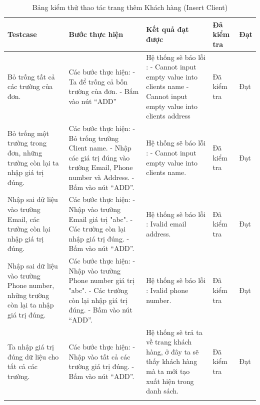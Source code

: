 \documentclass[a4paper]{article}
\begin{document}
\begin{longtable}{ | p{} |p{} | p{}  | p{}  | p{}  | } 
\hline
\textbf{Testcase}& \textbf{Bước thực hiện}& \textbf{Kết quả đạt được} & \textbf{Đã kiểm tra}& \textbf{Đạt} \\ 
\hline
\hline
Bỏ trống tất cả các trường của đơn. &
Các bước thực hiện: \newline
- Ta để trống cả bốn trường của đơn. \newline
- Bấm vào nút “ADD”
&
Hệ thống sẽ báo lỗi :  \newline
- Cannot input empty value into clients name \newline
- Cannot input empty value into clients address
&
Đã kiểm tra &
Đạt \\

\hline
Bỏ trống một trường trong đơn, những trường còn lại ta nhập giá trị đúng. &
Các bước thực hiện: \newline
- Bỏ trống trường Client name.  \newline
- Nhập các giá trị đúng vào trường Email, Phone number và Address.  \newline
- Bấm vào nút “ADD”.
&
Hệ thống sẽ báo lỗi :  \newline
- Cannot input empty value into clients name.
&
Đã kiểm tra &
Đạt \\

\hline
Nhập sai dữ liệu vào trường Email, các trường còn lại nhập giá trị đúng. &
Các bước thực hiện: \newline
- Nhập vào trường Email giá trị  "abc". \newline
- Các trường còn lại nhập giá trị đúng.  \newline
- Bấm vào nút “ADD”.
&
Hệ thống sẽ báo lỗi : Ivalid email address.
&
Đã kiểm tra &
Đạt \\

\hline
Nhập sai dữ liệu vào trường Phone number, những trường còn lại ta nhập giá trị đúng. &
Các bước thực hiện: \newline
- Nhập vào trường Phone number giá trị  "abc". \newline
- Các trường còn lại nhập giá trị đúng.  \newline
- Bấm vào nút “ADD”.
&
Hệ thống sẽ báo lỗi : Ivalid phone number.
&
Đã kiểm tra &
Đạt \\

\hline
Ta nhập giá trị đúng dữ liệu cho tất cả các trường. &
Các bước thực hiện: \newline
- Nhập vào tất cả các trường giá trị đúng. \newline
- Bấm vào nút “ADD”.
&
Hệ thống sẽ trả ta về trang khách hàng, ở đây ta sẽ thấy khách hàng mà ta mới tạo xuất hiện trong danh sách.
&
Đã kiểm tra &
Đạt \\

\hline
\caption{Bảng kiểm thử thao tác trang thêm Khách hàng (Insert Client)}
\end{longtable}
\end{document}
